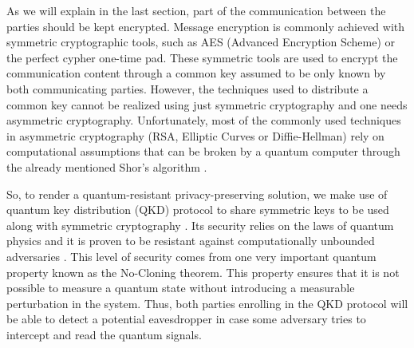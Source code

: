 As we will explain in the last section, part of the communication between the parties should be kept encrypted. Message encryption is commonly achieved with symmetric cryptographic tools, such as AES (Advanced Encryption Scheme) or the perfect cypher one-time pad. These symmetric tools are used to encrypt the communication content through a common key assumed to be only known by both communicating parties. However, the techniques used to distribute a common key cannot be realized using just symmetric cryptography and one needs asymmetric cryptography. Unfortunately, most of the commonly used techniques in asymmetric cryptography (RSA, Elliptic Curves or Diffie-Hellman) rely on computational assumptions that can be broken by a quantum computer through the already mentioned Shor's algorithm \cite{Sho95}.

So, to render a quantum-resistant privacy-preserving solution, we make use of quantum key distribution (QKD) protocol to share symmetric keys to be used along with symmetric cryptography \cite{Pirandola2020, Almeida2020, Silva2019, Almeida2021}. Its security relies on the laws of quantum physics and it is proven to be resistant against computationally unbounded adversaries \cite{R06, Tomamichel2017}. This level of security comes from one very important quantum property known as the No-Cloning theorem. This property ensures that it is not possible to measure a quantum state without introducing a measurable perturbation in the system. Thus, both parties enrolling in the QKD protocol will be able to detect a potential eavesdropper in case some adversary tries to intercept and read the quantum signals.


%



